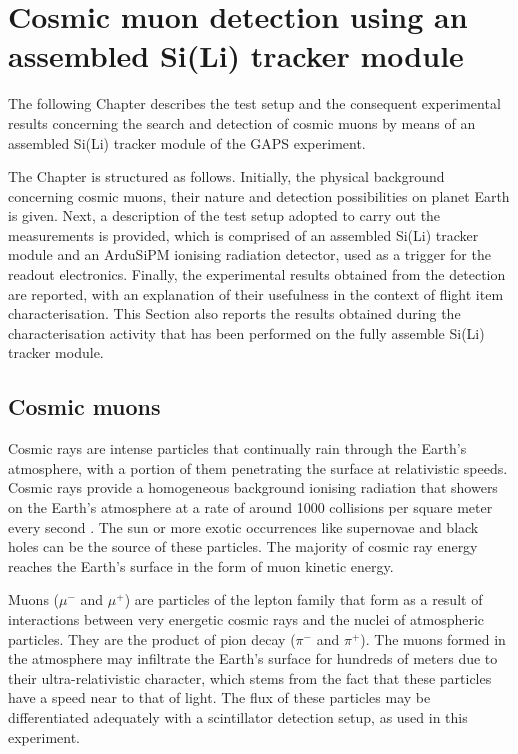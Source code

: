 \chapter{Cosmic muon detection using an assembled Si(Li) tracker module} \label{ch3}

The following Chapter describes the test setup and the consequent experimental results concerning the search and detection of cosmic muons by means of an assembled Si(Li) tracker module of the GAPS experiment.

\par
The Chapter is structured as follows. Initially, the physical background concerning cosmic muons, their nature and detection possibilities on planet Earth is given. Next, a description of the test setup adopted to carry out the measurements is provided, which is comprised of an assembled Si(Li) tracker module and an ArduSiPM ionising radiation detector, used as a trigger for the readout electronics. Finally, the experimental results obtained from the detection are reported, with an explanation of their usefulness in the context of flight item characterisation. This Section also reports the results obtained during the characterisation activity that has been performed on the fully assemble Si(Li) tracker module.


\section{Cosmic muons}

Cosmic rays are intense particles that continually rain through the Earth's atmosphere, with a portion of them penetrating the surface at relativistic speeds. Cosmic rays provide a homogeneous background ionising radiation that showers on the Earth's atmosphere at a rate of around 1000 collisions per square meter every second \cite{uretsky_1997_penetration}. The sun or more exotic occurrences like supernovae and black holes can be the source of these particles. The majority of cosmic ray energy reaches the Earth's surface in the form of muon kinetic energy.

\par
Muons ($\mu^{-}$ and $\mu^{+}$) are particles of the lepton family \cite{klapdorkleingrothaus_2018_lepton} that form as a result of interactions between very energetic cosmic rays and the nuclei of atmospheric particles. They are the product of pion decay ($\pi^{-}$ and $\pi^{+}$). The muons formed in the atmosphere may infiltrate the Earth's surface for hundreds of meters due to their ultra-relativistic character, which stems from the fact that these particles have a speed near to that of light. The flux of these particles may be differentiated adequately with a scintillator detection setup, as used in this experiment.


